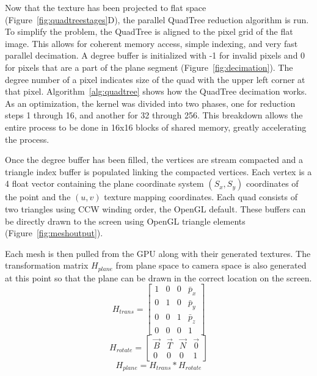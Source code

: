 Now that the texture has been projected to flat space (Figure~\ref{fig:quadtreestages}D), the parallel QuadTree reduction algorithm is run. To simplify the problem, the QuadTree is aligned to the pixel grid of the flat image. This allows for coherent memory access, simple indexing, and very fast parallel decimation. A degree buffer is initialized with -1 for invalid pixels and 0 for pixels that are a part of the plane segment (Figure~\ref{fig:decimation}). The degree number of a pixel indicates size of the quad with the upper left corner at that pixel. Algorithm~\ref{alg:quadtree} shows how the QuadTree decimation works. As an optimization, the kernel was divided into two phases, one for reduction steps 1 through 16, and another for 32 through 256. This breakdown allows the entire process to be done in 16x16 blocks of shared memory, greatly accelerating the process.\par
Once the degree buffer has been filled, the vertices are stream compacted and a triangle index buffer is populated linking the compacted vertices. Each vertex is a 4 float vector containing the plane coordinate system $(S_x,S_y)$ coordinates of the point and the $(u,v)$ texture mapping coordinates. Each quad consists of two triangles using CCW winding order, the OpenGL default. These buffers can be directly drawn to the screen using OpenGL triangle elements (Figure~\ref{fig:meshoutput}).\par
Each mesh is then pulled from the GPU along with their generated textures. The transformation matrix $H_{plane}$ from plane space to camera space is also generated at this point so that the plane can be drawn in the correct location on the screen. 
$$H_{trans} = \begin{bmatrix}
  1 & 0 & 0 & \bar{p}_x \\
  0 & 1 & 0 & \bar{p}_y \\
  0 & 0 & 1 & \bar{p}_z \\
  0 & 0 & 0 & 1
 \end{bmatrix}$$
 $$H_{rotate} = \begin{bmatrix}
  \vec{B} & \vec{T} & \vec{N} & \vec{0} \\
  0 & 0 & 0 & 1
 \end{bmatrix}$$
$$H_{plane} = H_{trans}*H_{rotate}$$
